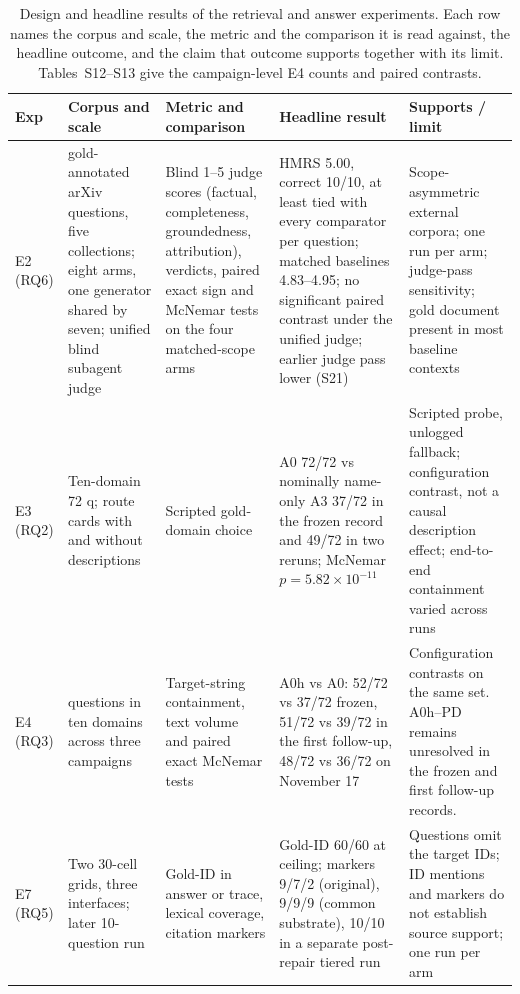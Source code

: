 \documentclass[final,5p,times,twocolumn]{elsarticle}
\begin{document}
\begin{table}[t]
\centering
\footnotesize
\setlength{\tabcolsep}{4pt}
\caption{Design and headline results of the retrieval and answer experiments.
Each row names the corpus and scale, the metric and the comparison it is read
against, the headline outcome, and the claim that outcome supports together
with its limit. Tables~S12--S13 give the campaign-level E4 counts and paired
contrasts.}
\label{tab:retrieval-design}
\begin{tabular}{@{}>{\raggedright\arraybackslash}p{}>{\raggedright\arraybackslash}p{}>{\raggedright\arraybackslash}p{}>{\raggedright\arraybackslash}p{}>{\raggedright\arraybackslash}p{}@{}}
\toprule
Exp & Corpus and scale & Metric and comparison & Headline result & Supports / limit\\
\midrule
E2 (RQ6) & 10 gold-annotated arXiv questions, five collections; eight arms, one generator shared by seven; unified blind subagent judge & Blind 1--5 judge scores (factual, completeness, groundedness, attribution), verdicts, paired exact sign and McNemar tests on the four matched-scope arms & HMRS 5.00, correct 10/10, at least tied with every comparator per question; matched baselines 4.83--4.95; no significant paired contrast under the unified judge; earlier judge pass lower (S21) & Scope-asymmetric external corpora; one run per arm; judge-pass sensitivity; gold document present in most baseline contexts\\
E3 (RQ2) & Ten-domain 72 q; route cards with and without descriptions & Scripted gold-domain choice & A0 72/72 vs nominally name-only A3 37/72 in the frozen record and 49/72 in two reruns; McNemar $p=5.82\times10^{-11}$ & Scripted probe, unlogged fallback; configuration contrast, not a causal description effect; end-to-end containment varied across runs\\
E4 (RQ3) & 72 questions in ten domains across three campaigns & Target-string containment, text volume and paired exact McNemar tests & A0h vs A0: 52/72 vs 37/72 frozen, 51/72 vs 39/72 in the first follow-up, 48/72 vs 36/72 on November 17 & Configuration contrasts on the same set. A0h--PD remains unresolved in the frozen and first follow-up records.\\
E7 (RQ5) & Two 30-cell grids, three interfaces; later 10-question run & Gold-ID in answer or trace, lexical coverage, citation markers & Gold-ID 60/60 at ceiling; markers 9/7/2 (original), 9/9/9 (common substrate), 10/10 in a separate post-repair tiered run & Questions omit the target IDs; ID mentions and markers do not establish source support; one run per arm\\

\end{tabular}
\end{table}
\end{document}
